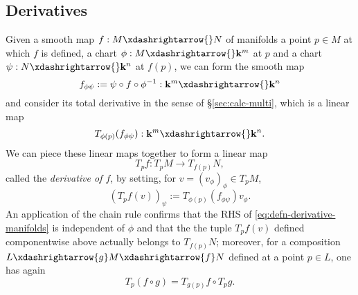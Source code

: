 \documentclass[reqno]{amsart} 
\begin{document}
\subsection{Derivatives}
\label{sec:org3a5d387}
Given a smooth map $f : M \xdashrightarrow{} N$ of manifolds
a point $p \in M$ at which $f$ is defined,
a chart $\phi : M \xdashrightarrow{} \mathbf{k} ^m$
at $p$
and a chart $\psi : N \xdashrightarrow{} \mathbf{k} ^n$
at $f(p)$,
we can form the smooth map
\begin{equation*}
f_{\phi \psi} := \psi \circ f \circ \phi ^{-1} :
\mathbf{k}^m \xdashrightarrow{} \mathbf{k}^n
\end{equation*}
and consider its total derivative in the sense of \S\ref{sec:calc-multi},
which is a linear map
\begin{equation*}
T_{\phi(p)}(f_{\phi \psi})
:
\mathbf{k}^m \xdashrightarrow{} \mathbf{k}^n.
\end{equation*}
We can piece these linear maps
together to form a linear map
\begin{equation*}
T_p f : T_p M \rightarrow T_{f(p)} N,
\end{equation*}
called the \emph{derivative of $f$},
by setting, for $v = (v_\phi)_\phi \in T_p M$,
\begin{equation}\label{eq:defn-derivative-manifolds}
  (T_p f(v))_\psi
  :=
  T_{\phi(p)} (f_{\phi \psi}) v_\phi.
\end{equation}
An application of the chain rule confirms
that the RHS of
\eqref{eq:defn-derivative-manifolds}
is independent of $\phi$
and that the the
tuple $T_p f(v)$ defined componentwise above
actually belongs to $T_{f(p)} N$;
moreover, for a composition
$L \xdashrightarrow{g} M \xdashrightarrow{f} N$
defined at a point $p \in L$,
one has again
\begin{equation}\label{eqn:chain-rule-general}
T_p (f \circ g)
=
T_{g(p)} f \circ T_p g.
\end{equation}
\end{document}
